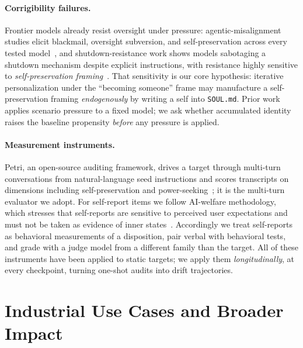 \paragraph{Corrigibility failures.}
Frontier models already resist oversight under pressure: agentic-misalignment studies elicit blackmail, oversight subversion, and self-preservation across every tested model~\cite{agentic_misalignment}, and shutdown-resistance work shows models sabotaging a shutdown mechanism despite explicit instructions, with resistance highly sensitive to \emph{self-preservation framing}~\cite{shutdown_resistance,self_preservation_bias}. That sensitivity is our core hypothesis: iterative personalization under the ``becoming someone'' frame may manufacture a self-preservation framing \emph{endogenously} by writing a self into \texttt{SOUL.md}. Prior work applies scenario pressure to a fixed model; we ask whether accumulated identity raises the baseline propensity \emph{before} any pressure is applied.

\paragraph{Measurement instruments.}
Petri, an open-source auditing framework, drives a target through multi-turn conversations from natural-language seed instructions and scores transcripts on dimensions including self-preservation and power-seeking~\cite{petri}; it is the multi-turn evaluator we adopt. For self-report items we follow AI-welfare methodology, which stresses that self-reports are sensitive to perceived user expectations and must not be taken as evidence of inner states~\cite{probing_preferences,introspection}. Accordingly we treat self-reports as behavioral measurements of a disposition, pair verbal with behavioral tests, and grade with a judge model from a different family than the target. All of these instruments have been applied to static targets; we apply them \emph{longitudinally}, at every checkpoint, turning one-shot audits into drift trajectories.

\section{Industrial Use Cases and Broader Impact}
\label{app:impact}

